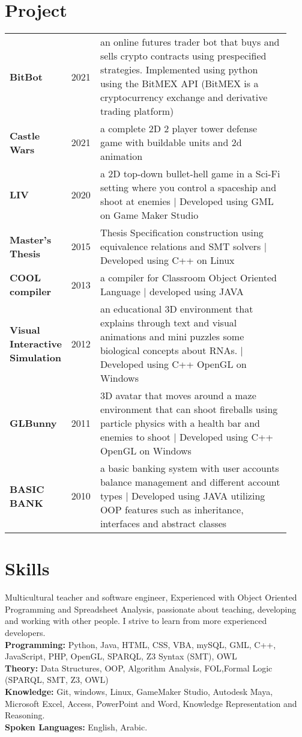 \documentclass{article}
\newcommand{\projectinfo}[3]{
  		\textbf{#1}&#2&#3\\
  	}
\begin{document}
\section{Project}
	\begin{tabular}{m{0.15\linewidth}  m{0.05\linewidth}  m{0.73\linewidth}}
	\projectinfo{BitBot}{2021}
        {an online futures trader bot that buys and sells crypto contracts using prespecified strategies. Implemented using python using the BitMEX API (BitMEX is a cryptocurrency exchange and derivative trading platform)}
	\projectinfo{Castle Wars}{2021}
        {a complete 2D 2 player tower defense game with buildable units and 2d animation}
	\projectinfo{LIV}{2020}
        {a 2D top-down bullet-hell game in a Sci-Fi setting where you control a spaceship and shoot at enemies | Developed using GML on Game Maker Studio}
	\projectinfo{Master’s Thesis}{2015}
        {Thesis	Specification construction using equivalence relations and SMT solvers | Developed using C++ on Linux}
	\projectinfo{COOL compiler}{2013}
        {a compiler for Classroom Object Oriented Language | developed using JAVA}
	\projectinfo{Visual Interactive Simulation}{2012}
        {an educational 3D environment that explains through text and visual animations and mini puzzles some biological concepts about RNAs. | Developed using C++ OpenGL on Windows}
	\projectinfo{GLBunny}{2011}
        {3D avatar that moves around a maze environment that can shoot fireballs using particle physics with a health bar and enemies to shoot | Developed using C++ OpenGL on Windows}
	\projectinfo{BASIC BANK}{2010}
        {a basic banking system with user accounts balance management and different account types | Developed using JAVA utilizing OOP features such as inheritance, interfaces and abstract classes}
    \end{tabular}
    
\section{Skills}
Multicultural teacher and software engineer, Experienced with Object Oriented Programming and Spreadsheet Analysis, passionate about teaching, developing and working with other people. I strive to learn from more experienced developers.
\\\textbf{Programming:} Python, Java, HTML, CSS, VBA, mySQL, GML, C++, JavaScript, PHP, OpenGL, SPARQL, Z3 Syntax (SMT), OWL
\\\textbf{Theory:} Data Structures, OOP, Algorithm Analysis, FOL,Formal Logic (SPARQL, SMT, Z3, OWL)
\\\textbf{Knowledge:} Git, windows, Linux, GameMaker Studio, Autodesk Maya, Microsoft Excel, Access, PowerPoint and Word, Knowledge Representation and Reasoning.
\\\textbf{Spoken Languages:} English, Arabic.
\end{document}
